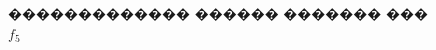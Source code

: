 \documentclass[a4paper]{article}
\begin{document}
\begin{figure}[h]
\begin{minipage}[h]{0.49\linewidth}
  \end{minipage}
  \caption{������������� ������ ������� ��� $f_5$}
  \label{ris:image1}
\end{figure}
\end{document}
